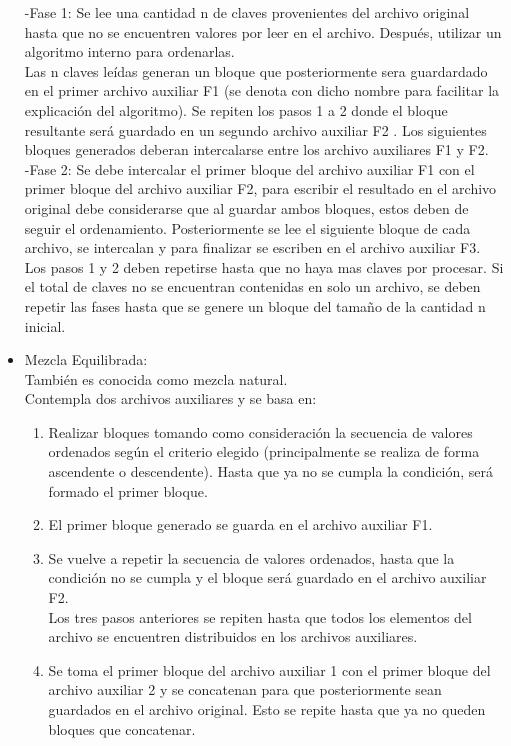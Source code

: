 \documentclass[12pt,letterpaper]{article}
\begin{document}
\begin{large}
\begin{itemize}
-Fase 1:
Se lee una cantidad n de claves provenientes del archivo original hasta que no se encuentren valores por leer en el archivo. Después, utilizar un algoritmo interno para ordenarlas.\\
Las n claves le\'idas generan un bloque que posteriormente sera guardardado en el primer archivo auxiliar F1 (se denota con dicho nombre para facilitar la explicación del algoritmo).
Se repiten los pasos 1 a 2 donde el bloque resultante será guardado en un segundo archivo auxiliar F2 .
Los siguientes bloques generados deberan intercalarse entre los archivo auxiliares F1 y F2.\\
-Fase 2:
Se debe intercalar el primer bloque del archivo auxiliar F1 con el primer bloque del archivo auxiliar F2, para escribir el resultado en el archivo original debe considerarse que al guardar ambos bloques, estos deben de seguir el ordenamiento.
Posteriormente se lee el siguiente bloque de cada archivo, se intercalan y para finalizar se escriben en el archivo auxiliar F3.
Los pasos 1 y 2 deben repetirse hasta que no haya mas claves por procesar.
Si el total de claves no se encuentran contenidas en solo un archivo, se deben repetir las fases hasta que se genere un bloque del tamaño de la cantidad n inicial. 
\item Mezcla Equilibrada:\\
También es conocida como mezcla natural.\\
Contempla dos archivos auxiliares y se basa en: 
\begin{enumerate}[noitemsep,topsep=0pt]
\item Realizar bloques tomando como consideración la secuencia de valores ordenados según el criterio elegido (principalmente se realiza de forma ascendente o descendente). Hasta que ya no se cumpla la condición, será formado el primer bloque.
\item El primer bloque generado se guarda en el archivo auxiliar F1.
\item Se  vuelve a repetir la secuencia de valores ordenados, hasta que la condición no se cumpla y el bloque será guardado en el archivo auxiliar F2. \\
Los tres pasos anteriores se repiten hasta que todos los elementos del archivo se encuentren distribuidos en los archivos auxiliares.
\item Se toma el primer bloque del archivo auxiliar 1 con el primer bloque del archivo auxiliar 2 y se concatenan para que posteriormente sean guardados en el archivo original. Esto se repite hasta que ya no queden bloques que concatenar.

\end{enumerate}
\end{itemize}
\end{large}
\end{document}
